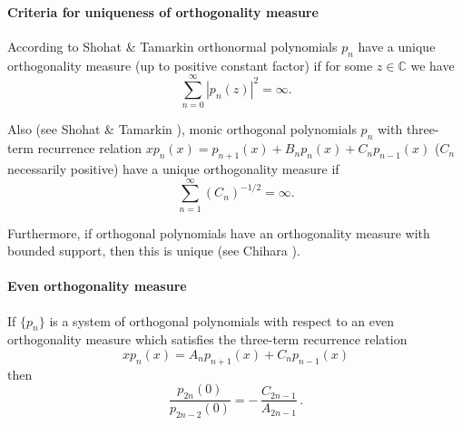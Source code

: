 \documentclass[twoside,11pt]{article}
\newcommand\CC{\mathbb{C}}
\newcommand\iy\infty
\begin{document}
\paragraph{Criteria for uniqueness of orthogonality measure}
According to Shohat \& Tamarkin \cite[p.50]{K6}
orthonormal polynomials $p_n$ have a unique orthogonality measure (up to positive
constant factor) if
for some $z\in\CC$ we have
\begin{equation}
\sum_{n=0}^\iy |p_n(z)|^2 = \iy.
\label{90}
\end{equation}

Also (see Shohat \& Tamarkin \cite[p.59]{K6}),
monic orthogonal polynomials $p_n$ with three-term recurrence relation
$x p_n(x) = p_{n+1}(x)+B_n p_n(x)+C_n p_{n-1}(x)$
($C_n$ necessarily positive)
have a unique orthogonality measure if
\begin{equation}
\sum_{n=1}^\iy (C_n)^{-1/2}=\iy.
\label{93}
\end{equation}

Furthermore, if orthogonal polynomials have an orthogonality measure with
bounded support, then this is unique (see Chihara ).
%
\paragraph{Even orthogonality measure}
If $\{p_n\}$ is a system of orthogonal polynomials with respect to an even
orthogonality measure which satisfies the three-term recurrence relation
\begin{equation*}
x p_n(x)=A_n p_{n+1}(x)+C_n p_{n-1}(x)
\end{equation*}
then
\begin{equation}
\frac{p_{2n}(0)}{p_{2n-2}(0)}=-\,\frac{C_{2n-1}}{A_{2n-1}}\,.
\label{1}
\end{equation}
%
\end{document}
